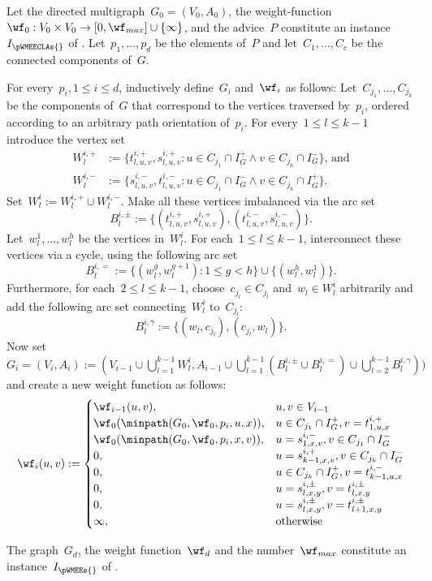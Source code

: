 \begin{construction}\label{cons:redwmeeatowmee}
  Let the directed multigraph~$G_0=(V_0,A_0)$, the weight-function~$\wf_0: V_0 \times V_0 \rightarrow [0, \wf_{max}]\cup \{\infty\}$, and the advice~$P$ constitute an instance~$I_\pWMEECLAs{}$ of \pWMEECLAs. Let~$p_1, \ldots, p_d$ be the elements of~$P$ and let~$C_1, \ldots, C_c$ be the connected components of~$G$.



  For every~$p_i, 1\leq i \leq d$, inductively define~$G_i$ and~$\wf_i$ as follows: Let~$C_{j_1}, \ldots, C_{j_{k}}$ be the components of~$G$ that correspond to the vertices traversed by~$p_i$, ordered according to an arbitrary path orientation of~$p_i$. For every~$1 \leq l \leq k - 1$ introduce the vertex set
\begin{align*}
  W_l^{i,+} & :=\{t^{i,+}_{l,u,v}, s^{i,+}_{l,u,v}:u \in C_{j_1} \cap I^+_G \wedge v \in C_{j_k} \cap I^-_G\} \text{, and}\\
  W_l^{i,-} & := \{s^{i,-}_{l,u,v}, t^{i,-}_{l,u,v}:u \in C_{j_1} \cap I^-_G \wedge v \in C_{j_k} \cap I^+_G\} \text{.}
\end{align*}
Set~$W^i_l := W_l^{i,+} \cup W_l^{i,-}$. Make all these vertices imbalanced via the arc set
\[B_l^{i,\pm} := \{(t^{i,+}_{l, u, v}, s^{i,+}_{l,u,v}), (t^{i,-}_{l,u,v}, s^{i,-}_{l, u, v})\} \text{.}\]
Let~$w^1_l, \ldots, w^h_l$ be the vertices in~$W^i_l$. For each~$1 \leq l \leq k-1$, interconnect these vertices via a cycle, using the following arc set
\[B_l^{i,=} := \{(w^g_{l}, w^{g+1}_{l}) : 1 \leq g < h\} \cup \{(w^h_l, w^1_l)\} \text{.}\]
Furthermore, for each~$2 \leq l \leq k -1$, choose~$c_{j_l} \in C_{j_l}$ and~$w_l \in W^i_l$ arbitrarily and add the following arc set connecting~$W_l^i$ to~$C_{j_l}$:
\[B_l^{i,\gamma} := \{(w_l, c_{j_l}), (c_{j_l}, w_l)\} \text{.}\]
Now set~$G_i = (V_i, A_i) := (V_{i - 1} \cup \bigcup_{l = 1}^{k-1} W^i_l, A_{i -1} \cup \bigcup_{l = 1}^{k-1} (B_l^{i,\pm} \cup B^{i,=}_l)\cup \bigcup_{l = 2}^{k-1} B_l^{i,\gamma}) )$ and create a new weight function as follows:
\[\wf_i(u, v) := 
\begin{cases}
  \wf_{i - 1}(u, v), & u, v \in V_{i - 1} \\
  \wf_0(\minpath(G_0, \wf_0, p_i, u, x)), & u \in C_{j_1} \cap I^+_G, v = t^{i,+}_{1, u, x} \\
  \wf_0(\minpath(G_0, \wf_0, p_i, x, v)), & u = s^{i,-}_{1, x, v} , v \in C_{j_1} \cap I^-_G \\
  0, & u = s^{i,+}_{k-1, x, v}, v \in C_{j_k} \cap I^-_G \\
  0, & u \in C_{j_k} \cap I^+_G , v = t^{i,-}_{k-1, u, x}  \\
  0, & u = s^{i,\pm}_{l, x, y}, v = t^{i,\pm}_{l, x, y} \\
0, & u = s^{i,\pm}_{l, x, y}, v = t^{i,\pm}_{l + 1, x, y} \\
\infty, & \text{otherwise}\\
\end{cases}
\]

The graph~$G_d$, the weight function~$\wf_d$ and the number~$\wf_{max}$ constitute an instance~$I_\pWMEEs{}$ of \pWMEEs{}.
\end{construction}
